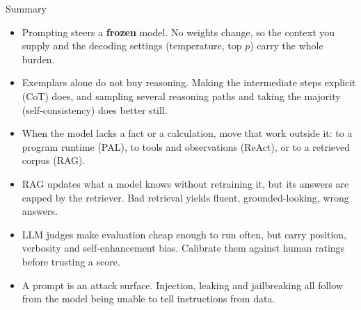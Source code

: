 \begin{frame}[t]{Summary}
  \small
  \begin{itemize}\itemsep0.45em
    \item[\textcolor{red}{$\blacktriangleright$}] Prompting steers a \textbf{frozen} model. No weights change, so the context you supply and the decoding settings (temperature, top $p$) carry the whole burden.
    \item[\textcolor{red}{$\blacktriangleright$}] Exemplars alone do not buy reasoning. Making the intermediate steps explicit (CoT) does, and sampling several reasoning paths and taking the majority (self-consistency) does better still.
    \item[\textcolor{red}{$\blacktriangleright$}] When the model lacks a fact or a calculation, move that work outside it: to a program runtime (PAL), to tools and observations (ReAct), or to a retrieved corpus (RAG).
    \item[\textcolor{red}{$\blacktriangleright$}] RAG updates what a model knows without retraining it, but its answers are capped by the retriever. Bad retrieval yields fluent, grounded-looking, wrong answers.
    \item[\textcolor{red}{$\blacktriangleright$}] LLM judges make evaluation cheap enough to run often, but carry position, verbosity and self-enhancement bias. Calibrate them against human ratings before trusting a score.
    \item[\textcolor{red}{$\blacktriangleright$}] A prompt is an attack surface. Injection, leaking and jailbreaking all follow from the model being unable to tell instructions from data.
  \end{itemize}
\end{frame}
